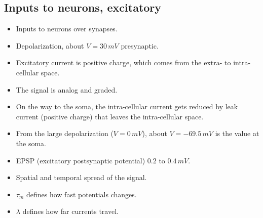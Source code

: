 \documentclass[a4paper, 12pt]{article}
\begin{document}
\subsection{Inputs to neurons, excitatory}
\begin{itemize}[noitemsep,nolistsep]
	\item Inputs to neurons over synapses.
	\item Depolarization, about $V=30\,mV$ presynaptic.
	\item Excitatory current is positive charge, which comes from the extra- to intra-cellular space.
	\item The signal is analog and graded.
	\item On the way to the soma, the intra-cellular current gets reduced by leak current (positive charge) that leaves the intra-cellular space.
	\item From the large depolarization ($V=0\,mV$), about $V=-69.5\,mV$ is the value at the soma.
	\item EPSP (excitatory postsynaptic potential) $0.2$ to $0.4\,mV$.
	\item Spatial and temporal spread of the signal.
	\item $\tau_m$ defines how fast potentials changes.
	\item $\lambda$ defines how far currents travel.
\end{itemize}
\begin{figure}[H]
	\centering
\end{figure}
\end{document}
